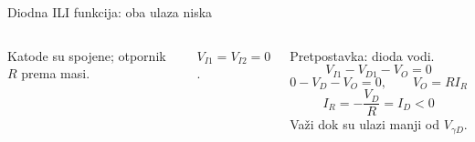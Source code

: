 \begin{frame}[label=10-s039]{Diodna ILI funkcija: oba ulaza niska}
\setlength{\abovedisplayskip}{4pt}\setlength{\belowdisplayskip}{4pt}\setlength{\abovedisplayshortskip}{3pt}\setlength{\belowdisplayshortskip}{3pt}
\begin{columns}[T,onlytextwidth]\centering \raggedright
Katode su spojene; otpornik $R$ prema masi.\par
$V_{I1}=V_{I2}=0$.\par\medskip
Pretpostavka: dioda vodi.
\[V_{I1}-V_{D1}-V_O=0\]
\[0-V_D-V_O=0,\qquad V_O=RI_R\]
\[I_R=-\frac{V_D}{R}=I_D<0\]
\medskip
Važi dok su ulazi manji od $V_{\gamma D}$.\end{columns}
\end{frame}

